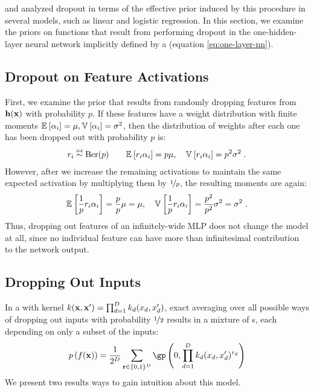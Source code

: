\citet{baldi2013understanding} and \citet{wang2013fast} analyzed dropout in terms of the effective prior induced by this procedure in several models, such as linear and logistic regression.
In this section, we examine the priors on functions that result from performing dropout in the one-hidden-layer neural network implicitly defined by a \gp{} (equation \eqref{eq:one-layer-nn}).



\subsection{Dropout on Feature Activations}

First, we examine the prior that results from randomly dropping features from ${\bf{h}}({\bf{x}})$ with probability $p$.
If these features have a weight distribution with finite moments
$\mathbb{E}_{} \left[ { \alpha_i} \right] = \mu, \mathbb{V}_{} \left[ {\alpha_i} \right] = \sigma^2$,
then the distribution of weights after each one has been dropped out with probability $p$ is:
\begin{align}
r_i \overset{\mbox{\tiny iid}}{\sim} \textnormal{Ber}(p)
\qquad
\mathbb{E}_{} \left[ { r_i \alpha_i} \right] = p\mu, \quad \mathbb{V}_{} \left[ {r_i \alpha_i} \right] = p^2 \sigma^2 \;.
\end{align}
However, after we increase the remaining activations to maintain the same expected activation by multiplying them by $\nicefrac{1}{p}$, the resulting moments are again:
\begin{align}
\mathbb{E}_{} \left[ { \frac{1}{p} r_i \alpha_i } \right] = \frac{p}{p}\mu = \mu, \quad \mathbb{V}_{} \left[ { \frac{1}{p} r_i \alpha_i} \right] = \frac{p^2}{p^2} \sigma^2 = \sigma^2 \;.
\end{align}
Thus, dropping out features of an infinitely-wide MLP does not change the model at all, since no individual feature can have more than infinitesimal contribution to the network output.



\subsection{Dropping Out Inputs}

In a \gp{} with kernel ${k({\bf{x}}, {\bf{x}}') = \prod_{d=1}^D k_d(x_d, x_d')}$, exact averaging over all possible ways of dropping out inputs with probability $\nicefrac{1}{2}$ results in a mixture of \gp{}s, each depending on only a subset of the inputs:
\begin{align}
p \left( f(\vx) \right)
= \frac{1}{2^D} \sum_{\vr \in \{0,1\}^D}  \textnormal{\gp} \left(0, \prod_{d=1}^D k_d(x_d, x_d')^{r_d} \right)
\label{eq:dropout-mixture}
\end{align}
We present two results ways to gain intuition about this model.

